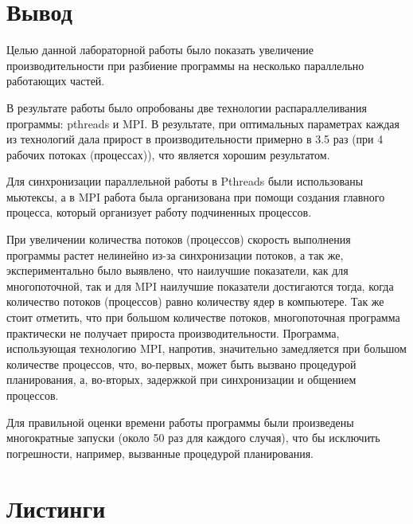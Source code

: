 \documentclass[12pt,a4paper]{report}
\begin{document}
			\section{Вывод}
			
				Целью данной лабораторной работы было показать увеличение 
				производительности при разбиение программы на несколько параллельно 
				работающих частей.
				
				В результате работы было опробованы две технологии распараллеливания 
				программы: pthreads и MPI. В результате, при оптимальных параметрах 
				каждая из технологий дала прирост в производительности примерно в 3.5 
				раз (при 4 рабочих потоках (процессах)), что является хорошим 
				результатом.
				
				Для синхронизации параллельной работы в Pthreads были использованы 
				мьютексы, а в MPI работа была организована при помощи создания главного 
				процесса,	который организует работу подчиненных процессов.
				
				При увеличении количества потоков (процессов) скорость выполнения 
				программы растет нелинейно из-за синхронизации потоков, а так же, 
				экспериментально было выявлено, что наилучшие показатели, как для 
				многопоточной, так и для MPI наилучшие показатели достигаются тогда, 
				когда количество потоков (процессов) равно количеству ядер в 
				компьютере. Так же стоит отметить, что при большом количестве потоков, 
				многопоточная программа практически не получает прироста 
				производительности. Программа, использующая технологию MPI, напротив, 
				значительно замедляется при большом количестве процессов, что, 
				во-первых, может быть вызвано процедурой планирования, а, во-вторых, 
				задержкой при синхронизации и общением процессов.
				
				Для правильной оценки времени работы программы были произведены 
				многократные запуски (около 50 раз для каждого случая), что бы 
				исключить погрешности, например, вызванные процедурой планирования.
				
			\section{Листинги}

				
			
				
			
\end{document}
